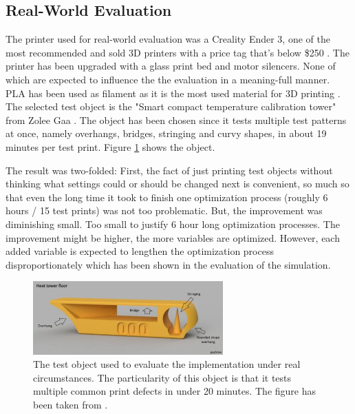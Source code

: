 \subsection{Real-World Evaluation}

The printer used for real-world evaluation was a Creality Ender 3, one of the most recommended and sold 3D printers with a price tag that's below \$250 \cite{buyersGuideEnder, buyersGuideEnder2}. The printer has been upgraded with a glass print bed and motor silencers. None of which are expected to influence the the evaluation in a meaning-full manner. PLA has been used as filament as it is the most used material for 3D printing \cite{statistaMaterial}. 
The selected test object is the "Smart compact temperature calibration tower" from Zolee Gaa \cite{smartCalibrationTower}. The object has been chosen since it tests multiple test patterns at once, namely overhangs, bridges, stringing and curvy shapes, in about 19 minutes per test print. Figure \ref{figure/smartCalibrationTowerSegment} shows the object. 

The result was two-folded: First, the fact of just printing test objects without thinking what settings could or should be changed next is convenient, so much so that even the long time it took to finish one optimization process (roughly 6 hours / 15 test prints) was not too problematic. But, the improvement was diminishing small. Too small to justify 6 hour long optimization processes. The improvement might be higher, the more variables are optimized. However, each added variable is expected to lengthen the optimization process disproportionately which has been shown in the evaluation of the simulation.  

\begin{figure}[b]
    \centering
    \includegraphics[width=0.65\textwidth]{assets/smartCalibrationTowerSegment.png}
    \caption{The test object used to evaluate the implementation under real circumstances. The particularity of this object is that it tests multiple common print defects in under 20 minutes. The figure has been taken from \cite{smartCalibrationTower}.}
    \label{figure/smartCalibrationTowerSegment}
\end{figure}